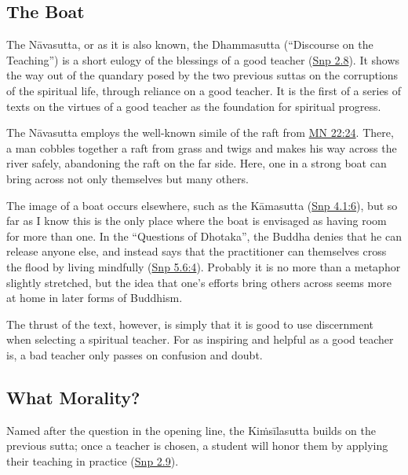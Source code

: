 \documentclass[12pt,openany]{book}%
\begin{document}
\subsection*{The Boat}

The \textsanskrit{Nāvasutta}, or as it is also known, the Dhammasutta (“Discourse on the Teaching”) is a short eulogy of the blessings of a good teacher (\href{https://suttacentral.net/snp2.8/en/sujato}{Snp 2.8}). It shows the way out of the quandary posed by the two previous suttas on the corruptions of the spiritual life, through reliance on a good teacher. It is the first of a series of texts on the virtues of a good teacher as the foundation for spiritual progress.

The \textsanskrit{Nāvasutta} employs the well-known simile of the raft from \href{https://suttacentral.net/mn22/en/sujato\#24}{MN 22:24}. There, a man cobbles together a raft from grass and twigs and makes his way across the river safely, abandoning the raft on the far side. Here, one in a strong boat can bring across not only themselves but many others.

The image of a boat occurs elsewhere, such as the \textsanskrit{Kāmasutta} (\href{https://suttacentral.net/snp4.1/en/sujato\#6}{Snp 4.1:6}), but so far as I know this is the only place where the boat is envisaged as having room for more than one. In the “Questions of Dhotaka”, the Buddha denies that he can release anyone else, and instead says that the practitioner can themselves cross the flood by living mindfully (\href{https://suttacentral.net/snp5.6/en/sujato\#4}{Snp 5.6:4}). Probably it is no more than a metaphor slightly stretched, but the idea that one’s efforts bring others across seems more at home in later forms of Buddhism.

The thrust of the text, however, is simply that it is good to use discernment when selecting a spiritual teacher. For as inspiring and helpful as a good teacher is, a bad teacher only passes on confusion and doubt.

\subsection*{What Morality?}

Named after the question in the opening line, the \textsanskrit{Kiṁsīlasutta} builds on the previous sutta; once a teacher is chosen, a student will honor them by applying their teaching in practice (\href{https://suttacentral.net/snp2.9/en/sujato}{Snp 2.9}).
\end{document}

